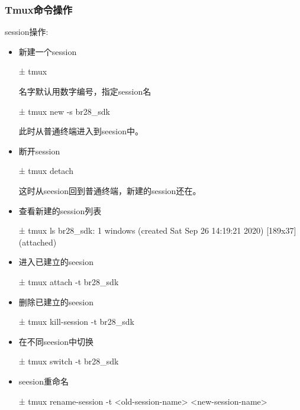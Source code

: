 \subsubsection{Tmux命令操作}
session操作:
\begin{itemize}
\item 新建一个session
\begin{commandbox}
± tmux
\end{commandbox}
名字默认用数字编号，指定session名
\begin{commandbox}
± tmux new -s br28_sdk
\end{commandbox}
此时从普通终端进入到seesion中。
\item 断开session
\begin{commandbox}
± tmux detach
\end{commandbox}
这时从seesion回到普通终端，新建的session还在。
\item 查看新建的session列表
\begin{commandbox}
± tmux ls    
br28_sdk: 1 windows (created Sat Sep 26 14:19:21 2020) [189x37] (attached)
\end{commandbox}
\item 进入已建立的seesion
\begin{commandbox}
± tmux attach -t br28_sdk
\end{commandbox}
\item 删除已建立的seesion
\begin{commandbox}
± tmux kill-session -t br28_sdk
\end{commandbox}
\item 在不同seesion中切换
\begin{commandbox}
± tmux switch -t br28_sdk
\end{commandbox}
\item seesion重命名
\begin{commandbox}
± tmux rename-session -t <old-session-name> <new-session-name>
\end{commandbox}
\end{itemize}

